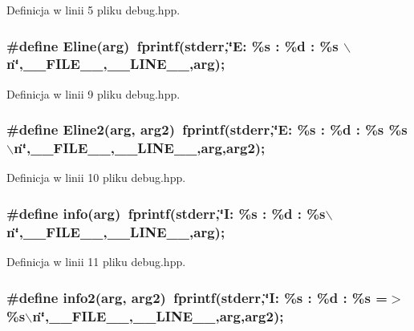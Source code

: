 Definicja w linii 5 pliku debug.hpp.\hypertarget{a00005_b3fdd01cf4ecc9316aa5051f88e36af2}{
\subsubsection[{Eline}]{\setlength{\rightskip}{0pt plus 5cm}\#define Eline(arg)~fprintf(stderr,\char`\"{}E: \%s : \%d : \%s $\backslash$n\char`\"{},\_\-\_\-FILE\_\-\_\-,\_\-\_\-LINE\_\-\_\-,arg);}}
\label{a00005_b3fdd01cf4ecc9316aa5051f88e36af2}




Definicja w linii 9 pliku debug.hpp.\hypertarget{a00005_66e7745144eb47a4111a0c2b5f66d6ac}{
\subsubsection[{Eline2}]{\setlength{\rightskip}{0pt plus 5cm}\#define Eline2(arg, \/  arg2)~fprintf(stderr,\char`\"{}E: \%s : \%d : \%s \%s$\backslash$n\char`\"{},\_\-\_\-FILE\_\-\_\-,\_\-\_\-LINE\_\-\_\-,arg,arg2);}}
\label{a00005_66e7745144eb47a4111a0c2b5f66d6ac}




Definicja w linii 10 pliku debug.hpp.\hypertarget{a00005_590af51ecfed28223c4e6ce02994241a}{
\subsubsection[{info}]{\setlength{\rightskip}{0pt plus 5cm}\#define info(arg)~fprintf(stderr,\char`\"{}I: \%s : \%d : \%s$\backslash$n\char`\"{},\_\-\_\-FILE\_\-\_\-,\_\-\_\-LINE\_\-\_\-,arg);}}
\label{a00005_590af51ecfed28223c4e6ce02994241a}




Definicja w linii 11 pliku debug.hpp.\hypertarget{a00005_51633d6d15647d74f756bcf969fc70ae}{
\subsubsection[{info2}]{\setlength{\rightskip}{0pt plus 5cm}\#define info2(arg, \/  arg2)~fprintf(stderr,\char`\"{}I: \%s : \%d : \%s =$>$ \%s$\backslash$n\char`\"{},\_\-\_\-FILE\_\-\_\-,\_\-\_\-LINE\_\-\_\-,arg,arg2);}}
\label{a00005_51633d6d15647d74f756bcf969fc70ae}




